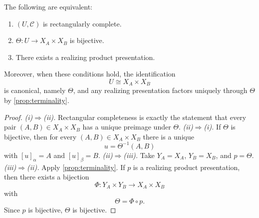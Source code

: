 \begin{theorem}
	\label{thm:classification}
	The following are equivalent:
	\begin{enumerate}
		\item[\emph{(i)}] \((U,\mathcal C)\) is rectangularly complete.
		\item[\emph{(ii)}] \(\Theta:U\to X_A\times X_B\) is bijective.
		\item[\emph{(iii)}] There exists a realizing product presentation.
	\end{enumerate}
	Moreover, when these conditions hold, the identification
	\[
		U\cong X_A\times X_B
	\]
	is canonical, namely \(\Theta\), and any realizing presentation factors
	uniquely through \(\Theta\) by \cref{prop:terminality}.
\end{theorem}
\begin{proof}
	\emph{(i)\(\Rightarrow\)(ii).}
	Rectangular completeness is exactly the statement that every pair
	\((A,B)\in X_A\times X_B\) has a unique preimage under \(\Theta\).
	\emph{(ii)\(\Rightarrow\)(i).}
	If \(\Theta\) is bijective, then for every \((A,B)\in X_A\times X_B\)
	there is a unique
	\[
		u=\Theta^{-1}(A,B)
	\]
	with \([u]_\alpha=A\) and \([u]_\beta=B\).
	\emph{(ii)\(\Rightarrow\)(iii).}
	Take \(Y_A=X_A\), \(Y_B=X_B\), and \(p=\Theta\).
	\emph{(iii)\(\Rightarrow\)(ii).}
	Apply \cref{prop:terminality}. If \(p\) is a realizing product
	presentation, then there exists a bijection
	\[
		\Phi:Y_A\times Y_B\to X_A\times X_B
	\]
	with
	\[
		\Theta=\Phi\circ p.
	\]
	Since \(p\) is bijective, \(\Theta\) is bijective.
\end{proof}
